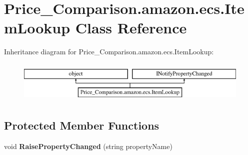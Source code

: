 \hypertarget{class_price___comparison_1_1amazon_1_1ecs_1_1_item_lookup}{\section{Price\-\_\-\-Comparison.\-amazon.\-ecs.\-Item\-Lookup Class Reference}
\label{class_price___comparison_1_1amazon_1_1ecs_1_1_item_lookup}
}


 


Inheritance diagram for Price\-\_\-\-Comparison.\-amazon.\-ecs.\-Item\-Lookup\-:\begin{figure}[H]
\begin{center}
\leavevmode
\includegraphics[height=2.000000cm]{class_price___comparison_1_1amazon_1_1ecs_1_1_item_lookup}
\end{center}
\end{figure}
\subsection*{Protected Member Functions}
\begin{DoxyCompactItemize}
\item 
\hypertarget{class_price___comparison_1_1amazon_1_1ecs_1_1_item_lookup_a4a8aaaa6ad0810ea13f15945b52e2dbd}{void {\bfseries Raise\-Property\-Changed} (string property\-Name)}\label{class_price___comparison_1_1amazon_1_1ecs_1_1_item_lookup_a4a8aaaa6ad0810ea13f15945b52e2dbd}

\end{DoxyCompactItemize}
